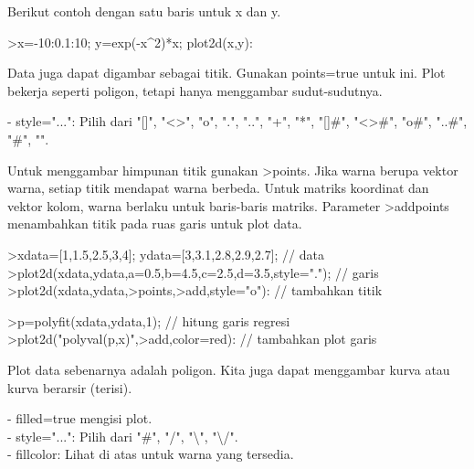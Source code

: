 \documentclass[a4paper,10pt]{article}
\begin{document}
\begin{eulernotebook}
\begin{eulercomment}
\begin{eulercomment}
\begin{eulercomment}
\begin{eulercomment}
\begin{eulercomment}
\begin{eulercomment}
\begin{eulercomment}
Berikut contoh dengan satu baris untuk x dan y.

\end{eulercomment}
\begin{eulerprompt}
>x=-10:0.1:10; y=exp(-x^2)*x; plot2d(x,y):
\end{eulerprompt}
\begin{eulercomment}
Data juga dapat digambar sebagai titik. Gunakan points=true untuk ini. Plot bekerja
seperti poligon, tetapi hanya menggambar sudut-sudutnya.

- style="...": Pilih dari "[]", "\textless{}\textgreater{}", "o", ".", "..", "+", "*", "[]#", "\textless{}\textgreater{}#", "o#",
"..#", "#", "\textbar{}".

Untuk menggambar himpunan titik gunakan \textgreater{}points. Jika warna berupa vektor warna,
setiap titik mendapat warna berbeda. Untuk matriks koordinat dan vektor kolom, warna
berlaku untuk baris-baris matriks. Parameter \textgreater{}addpoints menambahkan titik pada ruas
garis untuk plot data.
\end{eulercomment}
\begin{eulerprompt}
>xdata=[1,1.5,2.5,3,4]; ydata=[3,3.1,2.8,2.9,2.7]; // data
>plot2d(xdata,ydata,a=0.5,b=4.5,c=2.5,d=3.5,style="."); // garis
>plot2d(xdata,ydata,>points,>add,style="o"): // tambahkan titik
\end{eulerprompt}
\begin{eulerprompt}
>p=polyfit(xdata,ydata,1); // hitung garis regresi
>plot2d("polyval(p,x)",>add,color=red): // tambahkan plot garis
\end{eulerprompt}
\begin{eulercomment}
Plot data sebenarnya adalah poligon. Kita juga dapat menggambar kurva atau kurva
berarsir (terisi).

- filled=true mengisi plot.\\
- style="...": Pilih dari "#", "/", "\textbackslash{}", "\textbackslash{}/".\\
- fillcolor: Lihat di atas untuk warna yang tersedia.


\end{eulercomment}
\end{eulercomment}
\end{eulercomment}
\end{eulercomment}
\end{eulercomment}
\end{eulercomment}
\end{eulercomment}
\end{eulernotebook}
\end{document}
